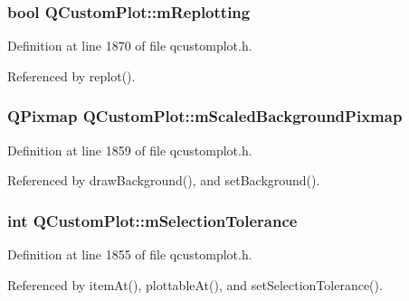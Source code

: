 \subsubsection[{m\+Replotting}]{\setlength{\rightskip}{0pt plus 5cm}bool Q\+Custom\+Plot\+::m\+Replotting\hspace{0.3cm}{\ttfamily [protected]}}\label{class_q_custom_plot_ab30daeca6612c3948afd368dce5f1c39}


Definition at line 1870 of file qcustomplot.\+h.



Referenced by replot().

\hypertarget{class_q_custom_plot_a081bf046501d52642dc6d7e3bdb97d57}{}
\subsubsection[{m\+Scaled\+Background\+Pixmap}]{\setlength{\rightskip}{0pt plus 5cm}Q\+Pixmap Q\+Custom\+Plot\+::m\+Scaled\+Background\+Pixmap\hspace{0.3cm}{\ttfamily [protected]}}\label{class_q_custom_plot_a081bf046501d52642dc6d7e3bdb97d57}


Definition at line 1859 of file qcustomplot.\+h.



Referenced by draw\+Background(), and set\+Background().

\hypertarget{class_q_custom_plot_abc36e12dd0482117ad810a800c847722}{}
\subsubsection[{m\+Selection\+Tolerance}]{\setlength{\rightskip}{0pt plus 5cm}int Q\+Custom\+Plot\+::m\+Selection\+Tolerance\hspace{0.3cm}{\ttfamily [protected]}}\label{class_q_custom_plot_abc36e12dd0482117ad810a800c847722}


Definition at line 1855 of file qcustomplot.\+h.



Referenced by item\+At(), plottable\+At(), and set\+Selection\+Tolerance().

